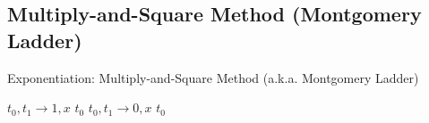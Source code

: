 \documentclass[12pt,openany]{book}
\theoremstyle{definition}
\begin{document}
	\newpage
	\subsection{Multiply-and-Square Method (Montgomery Ladder)}
	
	\begin{algorithm}[H]
		\caption{Exponentiation: Multiply-and-Square Method (a.k.a. Montgomery Ladder)}
		\vspace{8pt}
		\begin{multicols}{2}
			\vspace{8pt}
			$t_0,t_1\to 1,x$\;
			\Return $t_0$\;
			\vspace{8pt}
			\columnbreak %
			\setcounter{AlgoLine}{0}  %
			\vspace{8pt}
			$t_0,t_1\to 0,x$\;
			\Return $t_0$\;
			\vspace{8pt}
		\end{multicols}
		\vspace{8pt}
	\end{algorithm}
	\vspace{8pt}
\end{document}
